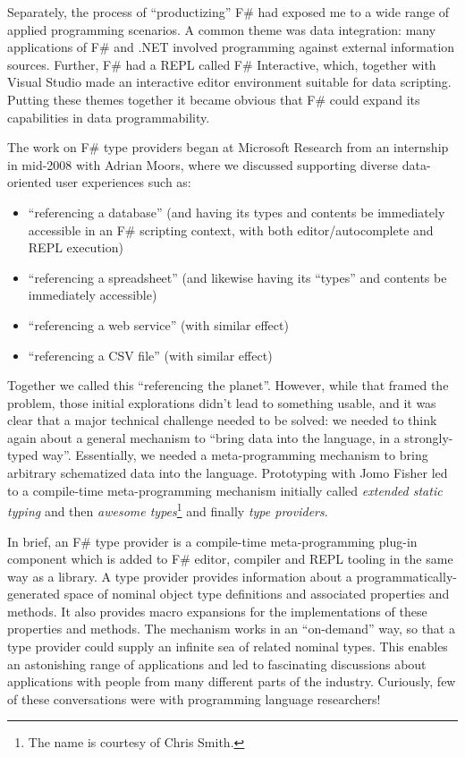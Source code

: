 \documentclass[acmsmall,screen]{acmart}
\begin{document}
Separately, the process of “productizing” F\# had exposed me to a wide range of applied programming scenarios.  A common theme
was data integration: many applications of F\# and .NET involved programming against external information sources.  Further, F\# had
a REPL called F\# Interactive, which, together with Visual Studio made an interactive editor environment suitable for data scripting.
Putting these themes together it became obvious that F\# could expand its capabilities in data programmability.

The work on F\# type providers began at Microsoft Research from an internship in mid-2008 with Adrian Moors, where we discussed
supporting diverse data-oriented user experiences such as:

\begin{itemize}
\item “referencing a database” (and having its types and contents be immediately accessible in an F\# scripting context, with both editor/autocomplete and REPL execution)
\item “referencing a spreadsheet” (and likewise having its “types” and contents be immediately accessible)
\item “referencing a web service” (with similar effect)
\item “referencing a CSV file” (with similar effect)
\end{itemize}

Together we called this “referencing the planet”.  However, while that framed the problem, those initial explorations didn’t lead
to something usable, and it was clear that a major technical challenge needed to be solved: we needed to think again about a
general mechanism to “bring data into the language, in a strongly-typed way”.  Essentially, we needed a meta-programming
mechanism to bring arbitrary schematized data into the language. Prototyping with Jomo Fisher led to a compile-time meta-programming
mechanism initially called \textit{extended static typing} and then \textit{awesome types}\footnote{The name is courtesy of Chris Smith.} and finally \textit{type providers}. 

In brief, an F\# type provider is a compile-time meta-programming plug-in component which is added to F\# editor, compiler
and REPL tooling in the same way as a library. A type provider provides information about a programmatically-generated space
of nominal object type definitions and associated properties and methods.  It also provides macro expansions for the implementations
of these properties and methods. The mechanism works in an “on-demand” way, so that a type provider could supply an infinite
sea of related nominal types.  This enables an astonishing range of applications and led to fascinating discussions about applications
with people from many different parts of the industry.  Curiously, few of these conversations were with programming language researchers!
\end{document}
